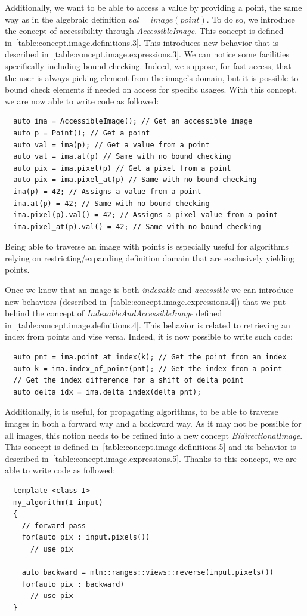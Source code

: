 Additionally, we want to be able to access a value by providing a point, the same way as in the algebraic definition
\(val = image(point)\). To do so, we introduce the concept of accessibility through \emph{AccessibleImage}. This concept
is defined in~\cref{table:concept.image.definitions.3}. This introduces new behavior that is described
in~\cref{table:concept.image.expressions.3}. We can notice some facilities specifically including bound checking.
Indeed, we suppose, for fast access, that the user is always picking element from the image's domain, but it is possible
to bound check elements if needed on access for specific usages. With this concept, we are now able to write code as
followed:
\begin{verbatim}
  auto ima = AccessibleImage(); // Get an accessible image
  auto p = Point(); // Get a point
  auto val = ima(p); // Get a value from a point
  auto val = ima.at(p) // Same with no bound checking
  auto pix = ima.pixel(p) // Get a pixel from a point
  auto pix = ima.pixel_at(p) // Same with no bound checking
  ima(p) = 42; // Assigns a value from a point
  ima.at(p) = 42; // Same with no bound checking
  ima.pixel(p).val() = 42; // Assigns a pixel value from a point
  ima.pixel_at(p).val() = 42; // Same with no bound checking
\end{verbatim}
Being able to traverse an image with points is especially useful for algorithms relying on restricting/expanding
definition domain that are exclusively yielding points.

Once we know that an image is both \emph{indexable} and \emph{accessible} we can introduce new behaviors (described
in~\cref{table:concept.image.expressions.4}) that we put behind the concept of \emph{IndexableAndAccessibleImage}
defined in~\cref{table:concept.image.definitions.4}. This behavior is related to retrieving an index from points and
vise versa. Indeed, it is now possible to write such code:
\begin{verbatim}
  auto pnt = ima.point_at_index(k); // Get the point from an index
  auto k = ima.index_of_point(pnt); // Get the index from a point
  // Get the index difference for a shift of delta_point
  auto delta_idx = ima.delta_index(delta_pnt);
\end{verbatim}

Additionally, it is useful, for propagating algorithms, to be able to traverse images in both a forward way and a
backward way. As it may not be possible for all images, this notion needs to be refined into a new concept
\emph{BidirectionalImage}. This concept is defined in~\cref{table:concept.image.definitions.5} and its behavior is
described in~\cref{table:concept.image.expressions.5}. Thanks to this concept, we are able to write code as followed:
\begin{verbatim}
  template <class I>
  my_algorithm(I input)
  {
    // forward pass
    for(auto pix : input.pixels())
      // use pix

    auto backward = mln::ranges::views::reverse(input.pixels())
    for(auto pix : backward)
      // use pix
  }
\end{verbatim}

